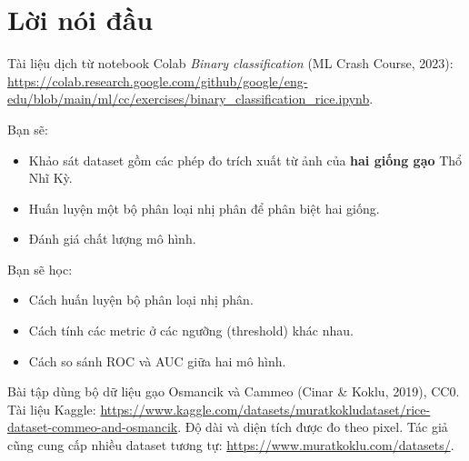 \documentclass[12pt,a4paper]{article}
\newcommand{\mlccurl}[1]{\url{#1}}
\begin{document}

\newpage
\tableofcontents
\newpage

\section*{Lời nói đầu}

\begin{ynghia}[title={Nguồn}]
Tài liệu dịch từ notebook Colab \textit{Binary classification} (ML Crash Course, 2023):
\mlccurl{https://colab.research.google.com/github/google/eng-edu/blob/main/ml/cc/exercises/binary_classification_rice.ipynb}.
\end{ynghia}

\begin{dongco}[title={Bài toán}]
Bạn sẽ:
\begin{itemize}
  \item Khảo sát dataset gồm các phép đo trích xuất từ ảnh của \textbf{hai giống gạo} Thổ Nhĩ Kỳ.
  \item Huấn luyện một bộ phân loại nhị phân để phân biệt hai giống.
  \item Đánh giá chất lượng mô hình.
\end{itemize}
\end{dongco}

\begin{phuongphap}[title={target học tập}]
Bạn sẽ học:
\begin{itemize}
  \item Cách huấn luyện bộ phân loại nhị phân.
  \item Cách tính các metric ở các ngưỡng (threshold) khác nhau.
  \item Cách so sánh ROC và AUC giữa hai mô hình.
\end{itemize}
\end{phuongphap}

\begin{ynghia}[title={Dataset}]
Bài tập dùng bộ dữ liệu gạo Osmancik và Cammeo (Cinar \& Koklu, 2019), CC0.
Tài liệu Kaggle:
\mlccurl{https://www.kaggle.com/datasets/muratkokludataset/rice-dataset-commeo-and-osmancik}.
Độ dài và diện tích được đo theo pixel. Tác giả cũng cung cấp nhiều dataset tương tự:
\mlccurl{https://www.muratkoklu.com/datasets/}.
\end{ynghia}
\end{document}
